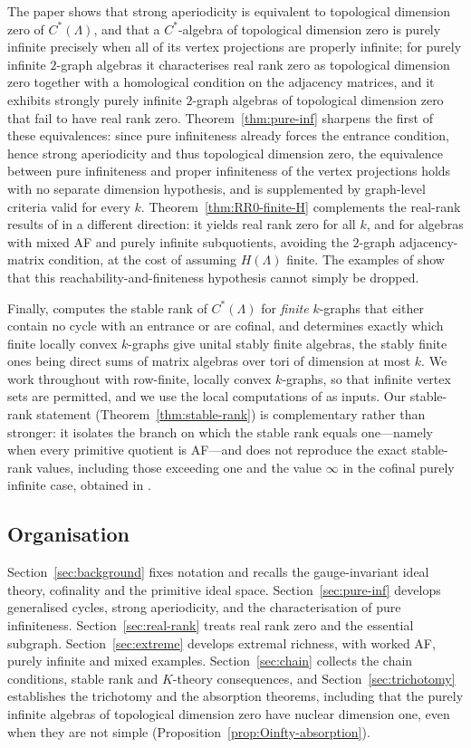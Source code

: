 \documentclass[12pt]{amsart}
\theoremstyle{plain}
\theoremstyle{definition}
\theoremstyle{remark}
\begin{document}
The paper \cite{PSS2} shows that strong aperiodicity is equivalent to
topological dimension zero of $C^*(\Lambda)$, and that a $C^*$-algebra of
topological dimension zero is purely infinite precisely when all of its vertex
projections are properly infinite; for purely infinite $2$-graph algebras it
characterises real rank zero as topological dimension zero together with a
homological condition on the adjacency matrices, and it exhibits strongly
purely infinite $2$-graph algebras of topological dimension zero that fail to
have real rank zero. Theorem~\ref{thm:pure-inf} sharpens the first of these
equivalences: since pure infiniteness already forces the entrance condition,
hence strong aperiodicity and thus topological dimension zero, the equivalence
between pure infiniteness and proper infiniteness of the vertex projections
holds with no separate dimension hypothesis, and is supplemented by graph-level
criteria valid for every $k$. Theorem~\ref{thm:RR0-finite-H} complements the
real-rank results of \cite{PSS2} in a different direction: it yields real rank
zero for all $k$, and for algebras with mixed AF and purely infinite
subquotients, avoiding the $2$-graph adjacency-matrix condition, at the cost of
assuming $H(\Lambda)$ finite. The examples of \cite{PSS2} show that this
reachability-and-finiteness hypothesis cannot simply be dropped.

Finally, \cite{PSS4} computes the stable rank of $C^*(\Lambda)$ for
\emph{finite} $k$-graphs that either contain no cycle with an entrance or are
cofinal, and determines exactly which finite locally convex $k$-graphs give
unital stably finite algebras, the stably finite ones being direct sums of
matrix algebras over tori of dimension at most $k$. We work throughout with
row-finite, locally convex $k$-graphs, so that infinite vertex sets are
permitted, and we use the local computations of
\cite[Proposition~2.7, Theorem~2.5]{PSS4} as inputs. Our stable-rank statement
(Theorem~\ref{thm:stable-rank}) is complementary rather than stronger: it
isolates the branch on which the stable rank equals one---namely when every
primitive quotient is AF---and does not reproduce the exact stable-rank
values, including those exceeding one and the value $\infty$ in the cofinal
purely infinite case, obtained in \cite{PSS4}.

\subsection*{Organisation}
Section~\ref{sec:background} fixes notation and recalls the gauge-invariant
ideal theory, cofinality and the primitive ideal space. Section~\ref{sec:pure-inf}
develops generalised cycles, strong aperiodicity, and the characterisation of
pure infiniteness. Section~\ref{sec:real-rank} treats real rank zero and the
essential subgraph. Section~\ref{sec:extreme} develops extremal richness, with
worked AF, purely infinite and mixed examples. Section~\ref{sec:chain} collects
the chain conditions, stable rank and $K$-theory consequences, and
Section~\ref{sec:trichotomy} establishes the trichotomy and the absorption
theorems, including that the purely infinite algebras of topological dimension
zero have nuclear dimension one, even when they are not simple
(Proposition~\ref{prop:Oinfty-absorption}).
\end{document}
